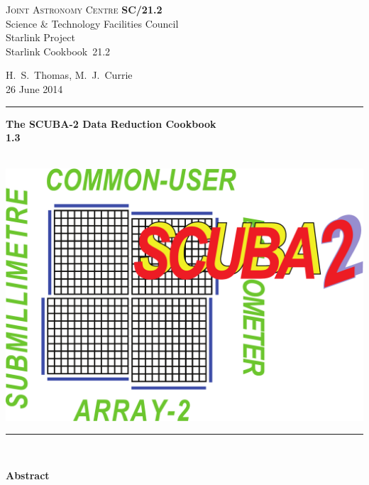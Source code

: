 \documentclass[twoside,11pt]{article}
\newcommand{\stardoccategory}  {Starlink Cookbook}
\newcommand{\stardocinitials}  {SC}
\newcommand{\stardocnumber}    {21.2}
\newcommand{\stardocauthors}   {H.\ S.\ Thomas, M.\ J.\ Currie}
\newcommand{\stardocdate}      {26 June 2014}
\newcommand{\stardoctitle}     {The SCUBA-2 Data Reduction Cookbook}
\newcommand{\stardocversion}   {1.3}
\newcommand{\stardocmanual}    {\ }
\newcommand{\stardocname}{\stardocinitials /\stardocnumber}
\newenvironment{latexonly}{}{}
\renewcommand{\_}{\texttt{\symbol{95}}}
\begin{document}
\thispagestyle{empty}

\begin{latexonly}
   \textsc{Joint Astronomy Centre} \hfill \textbf{\stardocname}\\
   {\large Science \& Technology Facilities Council}\\
   {\large Starlink Project\\}
   {\large \stardoccategory\ \stardocnumber}
   \begin{flushright}
   \stardocauthors\\
   \stardocdate
   \end{flushright}
   \vspace{-4mm}
   \rule{\textwidth}{0.5mm}
   \vspace{5mm}
   \begin{center}
   {\Huge\textbf{\stardoctitle \\ [2.5ex]}}
   {\LARGE\textbf{\stardocversion \\ [4ex]}}
   {\Huge\textbf{\stardocmanual}}
   \end{center}
   \vspace{5mm}

   \begin{center}
   \includegraphics[scale=0.4]{sc21_s2logo}
   \end{center}
   \vspace{5mm}
   \rule{\textwidth}{0.5mm}\\
   \vspace{15mm}

   \vspace{10mm}
   \begin{center}
      {\Large\textbf{Abstract}}
   \end{center}

\end{latexonly}
\end{document}
